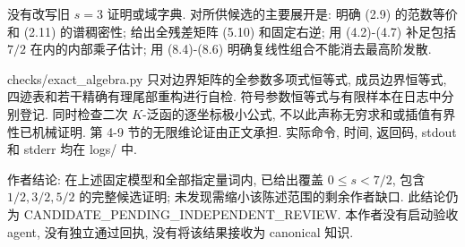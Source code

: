 \documentclass[UTF8,fontset=fandol,11pt,a4paper]{ctexart}
\begin{document}
没有改写旧 \(s=3\) 证明或域字典. 对所供候选的主要展开是: 明确 (2.9) 的范数等价和 (2.11) 的谱稠密性; 给出全残差矩阵 (5.10) 和固定右逆; 用 (4.2)-(4.7) 补足包括 \(7/2\) 在内的内部乘子估计; 用 (8.4)-(8.6) 明确复线性组合不能消去最高阶发散.


checks/exact\_algebra.py 只对边界矩阵的全参数多项式恒等式, 成员边界恒等式, 四迹表和若干精确有理尾部重构进行自检. 符号参数恒等式与有限样本在日志中分别登记. 同时检查二次 \(K\)-泛函的逐坐标极小公式, 不以此声称无穷求和或插值有界性已机械证明. 第 4-9 节的无限维论证由正文承担. 实际命令, 时间, 返回码, stdout 和 stderr 均在 logs/ 中.


作者结论: 在上述固定模型和全部指定量词内, 已给出覆盖 \(0\le s<7/2\), 包含 \(1/2,3/2,5/2\) 的完整候选证明; 未发现需缩小该陈述范围的剩余作者缺口. 此结论仍为 CANDIDATE\_PENDING\_INDEPENDENT\_REVIEW. 本作者没有启动验收 agent, 没有独立通过回执, 没有将该结果接收为 canonical 知识.
\end{document}
